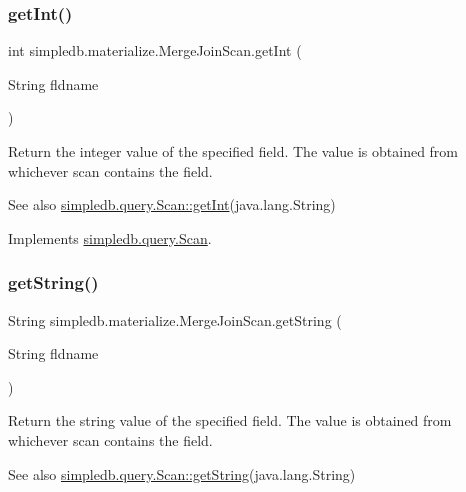 \subsubsection{\texorpdfstring{get\+Int()}{getInt()}}
{\footnotesize\ttfamily int simpledb.\+materialize.\+Merge\+Join\+Scan.\+get\+Int (\begin{DoxyParamCaption}\item[{String}]{fldname }\end{DoxyParamCaption})\hspace{0.3cm}{\ttfamily [inline]}}

Return the integer value of the specified field. The value is obtained from whichever scan contains the field. \begin{DoxySeeAlso}{See also}
\hyperlink{interfacesimpledb_1_1query_1_1Scan_a2e064555e16240115167b5d42d2b3d19}{simpledb.\+query.\+Scan\+::get\+Int}(java.\+lang.\+String) 
\end{DoxySeeAlso}


Implements \hyperlink{interfacesimpledb_1_1query_1_1Scan_a2e064555e16240115167b5d42d2b3d19}{simpledb.\+query.\+Scan}.

\mbox{\label{classsimpledb_1_1materialize_1_1MergeJoinScan_a75103d6b70f1138aa532abd01e9c436b}} 
\subsubsection{\texorpdfstring{get\+String()}{getString()}}
{\footnotesize\ttfamily String simpledb.\+materialize.\+Merge\+Join\+Scan.\+get\+String (\begin{DoxyParamCaption}\item[{String}]{fldname }\end{DoxyParamCaption})\hspace{0.3cm}{\ttfamily [inline]}}

Return the string value of the specified field. The value is obtained from whichever scan contains the field. \begin{DoxySeeAlso}{See also}
\hyperlink{interfacesimpledb_1_1query_1_1Scan_a922e219fee53ecfa6163525f9e3ef222}{simpledb.\+query.\+Scan\+::get\+String}(java.\+lang.\+String) 
\end{DoxySeeAlso}


